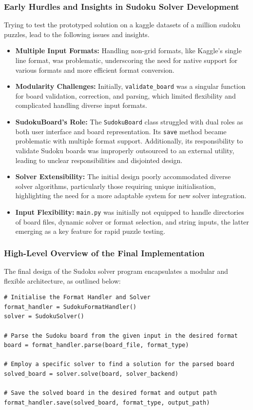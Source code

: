 \documentclass[11pt]{article}
\begin{document}
\subsubsection{Early Hurdles and Insights in Sudoku Solver Development}
Trying to test the prototyped solution on a kaggle datasets of a million sudoku puzzles, lead to the following issues and insights.
\begin{itemize}
\item \textbf{Multiple Input Formats:} Handling non-grid formats, like Kaggle's single line format, was problematic, underscoring the need for native support for various formats and more efficient format conversion.
\item \textbf{Modularity Challenges:} Initially, \texttt{validate\_board} was a singular function for board validation, correction, and parsing, which limited flexibility and complicated handling diverse input formats.
\item \textbf{SudokuBoard's Role:} The \texttt{SudokuBoard} class struggled with dual roles as both user interface and board representation. Its \texttt{save} method became problematic with multiple format support. Additionally, its responsibility to validate Sudoku boards was improperly outsourced to an external utility, leading to unclear responsibilities and disjointed design.

\item \textbf{Solver Extensibility:} The initial design poorly accommodated diverse solver algorithms, particularly those requiring unique initialisation, highlighting the need for a more adaptable system for new solver integration.

\item \textbf{Input Flexibility:} \texttt{main.py} was initially not equipped to handle directories of board files, dynamic solver or format selection, and string inputs, the latter emerging as a key feature for rapid puzzle testing.
\end{itemize}


\subsubsection{High-Level Overview of the Final Implementation}
The final design of the Sudoku solver program encapsulates a modular and flexible architecture, as outlined below:

\begin{verbatim}
# Initialise the Format Handler and Solver
format_handler = SudokuFormatHandler()
solver = SudokuSolver()

# Parse the Sudoku board from the given input in the desired format
board = format_handler.parse(board_file, format_type)

# Employ a specific solver to find a solution for the parsed board 
solved_board = solver.solve(board, solver_backend)

# Save the solved board in the desired format and output path
format_handler.save(solved_board, format_type, output_path)
\end{verbatim}
\end{document}
